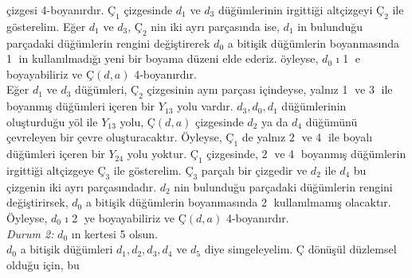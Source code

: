 \documentclass[fleqn]{book}
\begin{document}
çizgesi 4-boyanırdır. $Ç_1$ çizgesinde $d_1$ ve $d_3$
düğümlerinin irgittiği altçizgeyi $Ç_2$ ile
gösterelim. Eğer $d_1$ ve $d_3$, $Ç_2$ nin iki ayrı
parçasında ise, $d_1$ in bulunduğu parçadaki
düğümlerin rengini değiştirerek $d_0$ a bitişik
düğümlerin boyanmasında \textcircled{1} in kullanılmadığı
yeni bir boyama düzeni elde ederiz. öyleyse,
$d_0$ ı \textcircled{1} e boyayabiliriz ve $Ç(d,a)$ 4-boyanırdır.
\\
Eğer $d_1$ ve $d_3$ düğümleri, $Ç_2$ çizgesinin aynı
parçası içindeyse, yalnız \textcircled{1} ve \textcircled{3} ile boyanmış
düğümleri içeren bir $Y_{13}$ yolu vardır. $d_3, d_0, d_1$
düğümlerinin oluşturduğu yöl ile $Y_{13}$ yolu, $Ç(d,a)$
çizgesinde $d_2$ ya da $d_4$ düğümünü çevreleyen bir
çevre oluşturacaktır. Öyleyse, $Ç_1$ de yalnız \textcircled{2}
ve \textcircled{4} ile boyalı düğümleri içeren bir $Y_{24}$ yolu
yoktur. $Ç_1$ çizgesinde, \textcircled{2} ve \textcircled{4} boyanmış
düğümlerin irgittiği altçizgeye $Ç_3$ ile gösterelim.
$Ç_3$ parçalı bir çizgedir ve $d_2$ ile $d_4$ bu çizgenin
iki ayrı parçasındadır. $d_2$ nin bulunduğu parçadaki
düğümlerin rengini değiştirirsek, $d_0$ a bitişik
düğümlerin boyanmasında \textcircled{2} kullanılmamış olacaktır.
Öyleyse, $d_0$ ı \textcircled{2} ye boyayabiliriz ve $Ç(d,a)$
4-boyanırdır.
\\
\textit{Durum 2:} $d_0$ ın kertesi 5 olsun.
\\
$d_0$ a bitişik düğümleri $d_1, d_2, d_3, d_4$ ve $d_5$ diye
simgeleyelim. $Ç$ dönüşül düzlemsel olduğu için, bu
\end{document}

